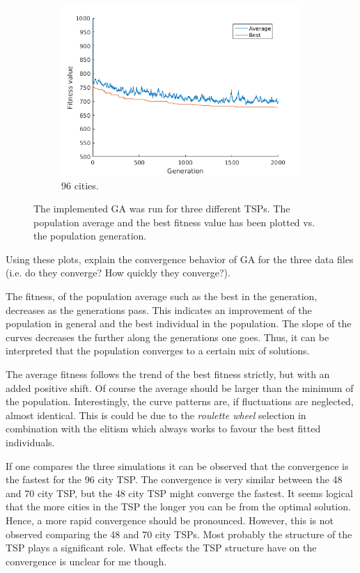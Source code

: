 \documentclass[]{article}
\begin{document}
\begin{figure}[H]
  \begin{subfigure}{\textwidth}
     \centering
     \includegraphics[width=0.5\linewidth]{../GA_TSP/t196.png}
     \caption{96 cities.}
     \label{sfig:t196}
  \end{subfigure}%
  \caption{The implemented GA was run for three different TSPs. The population average and the best fitness value has been plotted vs. the population generation.}
  \label{fig:task1}
\end{figure}

Using these plots, explain the convergence behavior of GA for the three data files (i.e. do they converge? How quickly they converge?).

The fitness, of the population average such as the best in the generation, decreases as the generations pass.
This indicates an improvement of the population in general and the best individual in the population.
The slope of the curves decreases the further along the generations one goes.
Thus, it can be interpreted that the population converges to a certain mix of solutions.

The average fitness follows the trend of the best fitness strictly, but with an added positive shift.
Of course the average should be larger than the minimum of the population.
Interestingly, the curve patterns are, if fluctuations are neglected, almost identical.
This is could be due to the {\it roulette wheel} selection in combination with the elitism which always works to favour the best fitted individuals.

If one compares the three simulations it can be observed that the convergence is the fastest for the 96 city TSP.
The convergence is very similar between the 48 and 70 city TSP, but the 48 city TSP might converge the fastest.
It seems logical that the more cities in the TSP the longer you can be from the optimal solution.
Hence, a more rapid convergence should be pronounced.
However, this is not observed comparing the 48 and 70 city TSPs.
Most probably the structure of the TSP plays a significant role.
What effects the TSP structure have on the convergence is unclear for me though.
\end{document}
